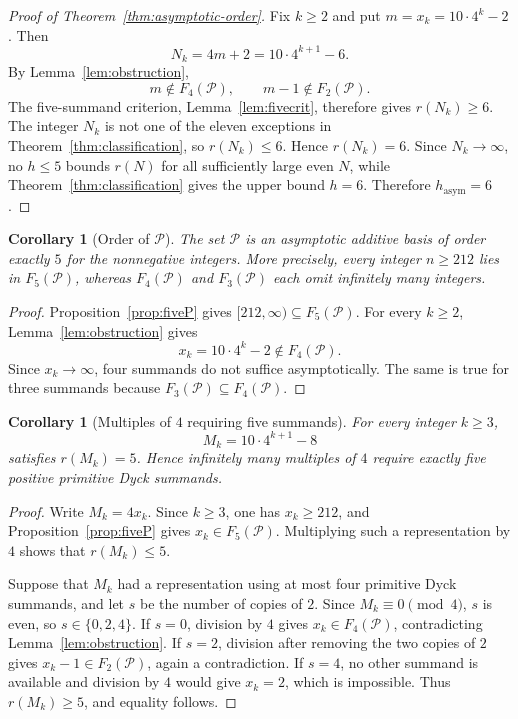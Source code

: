 \documentclass[12pt]{article}
\theoremstyle{plain}
\newtheorem{corollary}[theorem]{Corollary}
\theoremstyle{definition}
\theoremstyle{plain}
\newcommand{\Pset}{\mathcal{P}}
\begin{document}
\begin{proof}[Proof of Theorem~\ref{thm:asymptotic-order}]
Fix $k\geq2$ and put $m=x_k=10\cdot4^k-2$.  Then
\[
  N_k=4m+2=10\cdot4^{k+1}-6.
\]
By Lemma~\ref{lem:obstruction},
\[
  m\notin F_4(\Pset),\qquad m-1\notin F_2(\Pset).
\]
The five-summand criterion, Lemma~\ref{lem:fivecrit}, therefore gives
$r(N_k)\geq6$.  The integer $N_k$ is not one of the eleven exceptions in
Theorem~\ref{thm:classification}, so $r(N_k)\leq6$.  Hence $r(N_k)=6$.
Since $N_k\to\infty$, no $h\leq5$ bounds $r(N)$ for all sufficiently large even
$N$, while Theorem~\ref{thm:classification} gives the upper bound $h=6$.
Therefore $h_{\mathrm{asym}}=6$.
\end{proof}

\begin{corollary}[Order of $\Pset$]\label{cor:orderfive}
The set $\Pset$ is an asymptotic additive basis of order exactly $5$ for the
nonnegative integers.  More precisely, every integer $n\geq212$ lies in
$F_5(\Pset)$, whereas $F_4(\Pset)$ and $F_3(\Pset)$ each omit infinitely many
integers.
\end{corollary}

\begin{proof}
Proposition~\ref{prop:fiveP} gives $[212,\infty)\subseteq F_5(\Pset)$.  For
every $k\geq2$, Lemma~\ref{lem:obstruction} gives
\[
  x_k=10\cdot4^k-2\notin F_4(\Pset).
\]
Since $x_k\to\infty$, four summands do not suffice asymptotically.  The same is
true for three summands because $F_3(\Pset)\subseteq F_4(\Pset)$.
\end{proof}

\begin{corollary}[Multiples of $4$ requiring five summands]
\label{cor:five-multiples}
For every integer $k\geq3$,
\[
  M_k=10\cdot4^{k+1}-8
\]
satisfies $r(M_k)=5$.  Hence infinitely many multiples of $4$ require exactly
five positive primitive Dyck summands.
\end{corollary}

\begin{proof}
Write $M_k=4x_k$.  Since $k\geq3$, one has $x_k\geq212$, and
Proposition~\ref{prop:fiveP} gives $x_k\in F_5(\Pset)$.  Multiplying such a
representation by $4$ shows that $r(M_k)\leq5$.

Suppose that $M_k$ had a representation using at most four primitive Dyck
summands, and let $s$ be the number of copies of $2$.  Since
$M_k\equiv0\pmod4$, $s$ is even, so $s\in\{0,2,4\}$.  If $s=0$, division by
$4$ gives $x_k\in F_4(\Pset)$, contradicting Lemma~\ref{lem:obstruction}.  If
$s=2$, division after removing the two copies of $2$ gives
$x_k-1\in F_2(\Pset)$, again a contradiction.  If $s=4$, no other summand is
available and division by $4$ would give $x_k=2$, which is impossible.  Thus
$r(M_k)\geq5$, and equality follows.
\end{proof}
\end{document}
